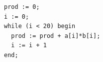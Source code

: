 \documentclass{article}
\begin{document}
\begin{Verbatim}
prod := 0;
i := 0;
while (i < 20) begin
  prod := prod + a[i]*b[i];
  i := i + 1
end;
\end{Verbatim}
\end{document}
